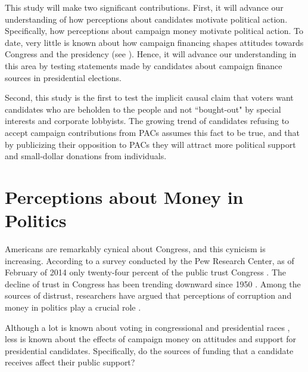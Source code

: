 \documentclass[12pt]{article}
\begin{document}
This study will make two significant contributions. First, it will advance our understanding of how perceptions about candidates motivate political action. Specifically, how perceptions about campaign money motivate political action. To date, very little is known about how campaign financing shapes attitudes towards Congress and the presidency (see \cite{dowling_super_2014, bowler_campaign_2016}). Hence, it will advance our understanding in this area by testing statements made by candidates about campaign finance sources in presidential elections.

Second, this study is the first to test the implicit causal claim that voters want candidates who are beholden to the people and not ``bought-out" by special interests and corporate lobbyists. The growing trend of candidates refusing to accept campaign contributions from PACs assumes this fact to be true, and that by publicizing their opposition to PACs they will attract more political support and small-dollar donations from individuals.  


\section{Perceptions about Money in Politics}

 Americans are remarkably cynical about Congress, and this cynicism is increasing. According to a survey conducted by the Pew Research Center, as of February of 2014 only twenty-four percent of the public trust Congress \citep{pew_research_center_public_2014}. The decline of trust in Congress has been trending downward since 1950 \citep{dalton_social_2005}. Among the sources of distrust, researchers have argued that perceptions of corruption and money in politics play a crucial role \citep{persily_perceptions_2004, vanheerde-hudson_parties_2013}. 
 
 Although a lot is known about voting in congressional \citep{abramowitz_explaining_1988, welch_effects_1997} and presidential races \citep{petrocik_issue_1996, nadeau_national_2001, polsby_landmarks_2002}, less is known about the effects of campaign money on attitudes and support for presidential candidates. Specifically, do the sources of funding that a candidate receives affect their public support? 
 
\end{document}
